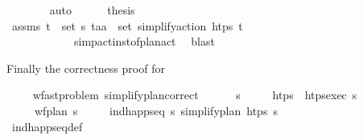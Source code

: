 \begin{isabellebody}
\ \ \ \ \ \ \isamarkupfalse%
\ auto\isanewline
\ \ \ \ \isamarkupfalse%
\ {\isacharquery}{\kern0pt}thesis\isanewline
\ \ \ \ \ \ \isamarkupfalse%
\ assms\ {\isacartoucheopen}{\isacharparenleft}{\kern0pt}t\isactrlsub {\isasympi}{\isacharcomma}{\kern0pt}{\isasympi}{\isacharparenright}{\kern0pt}\ {\isasymin}\ set\ {\isasympi}s{\isacartoucheclose}\ {\isacartoucheopen}{\isacharparenleft}{\kern0pt}t\isactrlsub a{\isacharcomma}{\kern0pt}a{\isacharparenright}{\kern0pt}\ {\isasymin}\ set\ {\isacharparenleft}{\kern0pt}simplify{\isacharunderscore}{\kern0pt}action\ htps\ {\isacharparenleft}{\kern0pt}t\isactrlsub {\isasympi}{\isacharcomma}{\kern0pt}{\isasympi}{\isacharparenright}{\kern0pt}{\isacharparenright}{\kern0pt}{\isacartoucheclose}\isanewline
\ \ \ \ \ \ \ \ \ \ \ \ simp{\isacharunderscore}{\kern0pt}act{\isacharunderscore}{\kern0pt}inst{\isacharunderscore}{\kern0pt}of{\isacharunderscore}{\kern0pt}plan{\isacharunderscore}{\kern0pt}act\ \isamarkupfalse%
\ blast\isanewline
\ \ \isamarkupfalse%
%
\endisatagproof
{\isafoldproof}%
%
\isadelimproof
%
\endisadelimproof
%
\begin{isamarkuptext}%
Finally the correctness proof for %
\end{isamarkuptext}\isamarkuptrue%
\ \ \isamarkupfalse%
\ {\isacharparenleft}{\kern0pt}\ wf{\isacharunderscore}{\kern0pt}ast{\isacharunderscore}{\kern0pt}problem{\isacharparenright}{\kern0pt}\ simplify{\isacharunderscore}{\kern0pt}plan{\isacharunderscore}{\kern0pt}correct{\isacharcolon}{\kern0pt}\ \isanewline
\ \ \ \ \ {\isasympi}s\isanewline
\ \ \ \ \ {\isachardoublequoteopen}htps\ {\isasymequiv}\ htps{\isacharunderscore}{\kern0pt}exec\ {\isasympi}s{\isachardoublequoteclose}\isanewline
\ \ \ \ \ {\isachardoublequoteopen}wf{\isacharunderscore}{\kern0pt}plan\ {\isasympi}s{\isachardoublequoteclose}\isanewline
\ \ \ \ \ {\isachardoublequoteopen}ind{\isacharunderscore}{\kern0pt}happ{\isacharunderscore}{\kern0pt}seq\ {\isasympi}s\ {\isacharparenleft}{\kern0pt}simplify{\isacharunderscore}{\kern0pt}plan\ htps\ {\isasympi}s{\isacharparenright}{\kern0pt}{\isachardoublequoteclose}\isanewline
%
\isadelimproof
\ \ \ \ %
\endisadelimproof
%
\isatagproof
{}\isamarkupfalse%
\ ind{\isacharunderscore}{\kern0pt}happ{\isacharunderscore}{\kern0pt}seq{\isacharunderscore}{\kern0pt}def\ \ \ \ \ \ \ \ \ \ \ \ \isanewline

\end{isabellebody}
